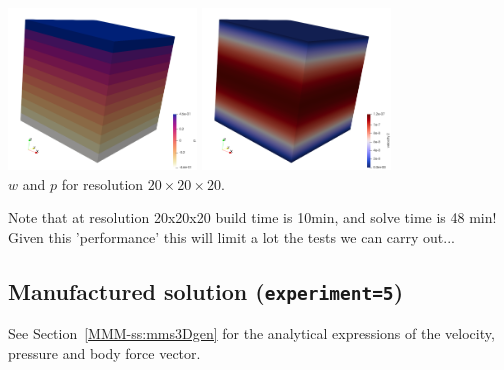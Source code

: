 \begin{center}
\includegraphics[width=5cm]{python_codes/fieldstone_10/resultsQ2/exp0/press}
\includegraphics[width=5cm]{python_codes/fieldstone_10/resultsQ2/exp0/w}\\
{\captionfont $w$ and $p$ for resolution $20\times 20 \times 20$.}
\end{center}

Note that at resolution 20x20x20 build time is 10min, and solve time is 48 min!
Given this 'performance' this will limit a lot the tests we can carry out...

\subsection*{Manufactured solution ({\tt experiment=5})}

See Section~\ref{MMM-ss:mms3Dgen} for the analytical expressions 
of the velocity, pressure and body force vector.

